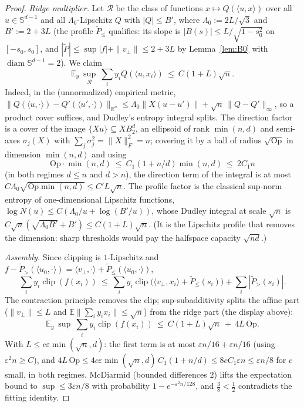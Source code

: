 \documentclass[11pt,reqno]{amsart}
\theoremstyle{plain}
\theoremstyle{definition}
\theoremstyle{remark}
\newcommand{\R}{\mathbb{R}}
\newcommand{\Sd}{\mathbb{S}^{d-1}}
\newcommand{\EE}{\mathbb{E}}
\newcommand{\eps}{\varepsilon}
\newcommand{\inn}[2]{\langle #1,#2\rangle}
\DeclareMathOperator{\clip}{clip}
\begin{document}
\begin{proof}[Proof]
\emph{Ridge multiplier.} Let $\mathcal R$ be the class of functions $x\mapsto Q(\inn ux)$ over all $u\in\Sd$ and all $\Lambda_0$-Lipschitz $Q$ with $|Q|\le B'$, where $\Lambda_0:=2L/\sqrt3$ and $B':=2+3L$ (the profile $\tilde P_\le$ qualifies: its slope is $|B(s)|\le L/\sqrt{1-s_0^2}$ on $[-s_0,s_0]$, and $|\tilde P|\le\sup|f|+\|v_\perp\|\le2+3L$ by Lemma~\ref{lem:B0} with $\operatorname{diam}\Sd=2$). We claim
\[
\EE_y\ \sup_{\mathcal R}\ \sum_iy_iQ(\inn u{x_i})\ \le\ C(1+L)\sqrt n .
\]
Indeed, in the (unnormalized) empirical metric, $\|Q(\inn u\cdot)-Q'(\inn{u'}\cdot)\|_{\R^n}\le\Lambda_0\|X(u-u')\|+\sqrt n\,\|Q-Q'\|_\infty$, so a product cover suffices, and Dudley's entropy integral \cite[Thm.~8.1.3]{Vershynin} splits. The direction factor is a cover of the image $\{Xu\}\subseteq XB_2^d$, an ellipsoid of rank $\min(n,d)$ and semi-axes $\sigma_j(X)$ with $\sum_j\sigma_j^2=\|X\|_F^2=n$; covering it by a ball of radius $\sqrt{\mathrm{Op}}$ in dimension $\min(n,d)$ and using
\[
\mathrm{Op}\cdot\min(n,d)\ \le\ C_1(1+n/d)\min(n,d)\ \le\ 2C_1n
\]
(in both regimes $d\le n$ and $d>n$), the direction term of the integral is at most $C\Lambda_0\sqrt{\mathrm{Op}\min(n,d)}\le C'L\sqrt n$. The profile factor is the classical sup-norm entropy of one-dimensional Lipschitz functions, $\log N(u)\le C(\Lambda_0/u+\log(B'/u))$, whose Dudley integral at scale $\sqrt n$ is $C\sqrt n(\sqrt{\Lambda_0B'}+B')\le C(1+L)\sqrt n$. (It is the Lipschitz profile that removes the dimension: sharp thresholds would pay the halfspace capacity $\sqrt{nd}$.)

\emph{Assembly.} Since clipping is $1$-Lipschitz and $f-\tilde P_>(\inn{u_0}\cdot)=\inn{v_\perp}\cdot+\tilde P_\le(\inn{u_0}\cdot)$,
\[
\sum_iy_i\clip(f(x_i))\ \le\ \sum_iy_i\clip\bigl(\inn{v_\perp}{x_i}+\tilde P_\le(s_i)\bigr)+\sum_i|\tilde P_>(s_i)| .
\]
The contraction principle removes the clip; sup-subadditivity splits the affine part ($\|v_\perp\|\le L$ and $\EE\|\sum_iy_ix_i\|\le\sqrt n$) from the ridge part (the display above):
\[
\EE_y\ \sup\ \sum_iy_i\clip(f(x_i))\ \le\ C(1+L)\sqrt n\ +\ 4L\,\mathrm{Op} .
\]
With $L\le c\eps\min(\sqrt n,d)$: the first term is at most $\eps n/16+\eps n/16$ (using $\eps^2n\ge C$), and $4L\,\mathrm{Op}\le4c\eps\min(\sqrt n,d)\,C_1(1+n/d)\le8cC_1\eps n\le\eps n/8$ for $c$ small, in both regimes. McDiarmid (bounded differences $2$) lifts the expectation bound to $\sup\le3\eps n/8$ with probability $1-e^{-\eps^2n/128}$, and $\tfrac38<\tfrac12$ contradicts the fitting identity.
\end{proof}
\end{document}
